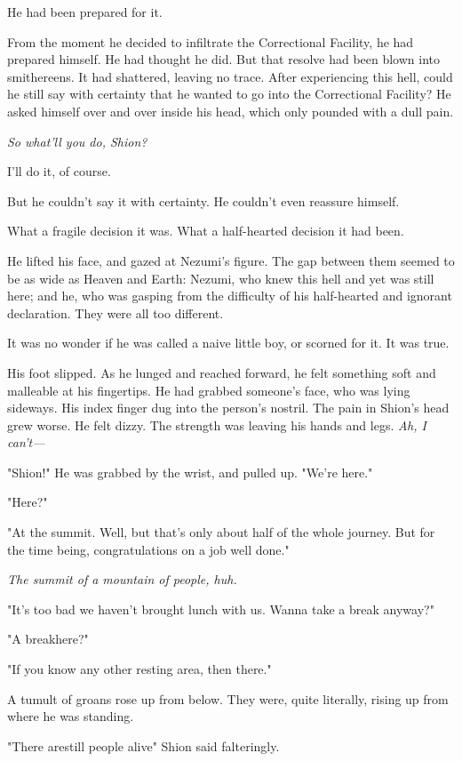 He had been prepared for it.

From the moment he decided to infiltrate the Correctional Facility, he
had prepared himself. He had thought he did. But that resolve had been
blown into smithereens. It had shattered, leaving no trace. After
experiencing this hell, could he still say with certainty that he wanted
to go into the Correctional Facility? He asked himself over and over
inside his head, which only pounded with a dull pain.

\emph{So what'll you do, Shion?}

I'll do it, of course.

But he couldn't say it with certainty. He couldn't even reassure
himself.

What a fragile decision it was. What a half-hearted decision it had
been.

He lifted his face, and gazed at Nezumi's figure. The gap between them
seemed to be as wide as Heaven and Earth: Nezumi, who knew this hell and
yet was still here; and he, who was gasping from the difficulty of his
half-hearted and ignorant declaration. They were all too different.

It was no wonder if he was called a naive little boy, or scorned for it.
It was true.

His foot slipped. As he lunged and reached forward, he felt something
soft and malleable at his fingertips. He had grabbed someone's face, who
was lying sideways. His index finger dug into the person's nostril. The
pain in Shion's head grew worse. He felt dizzy. The strength was leaving
his hands and legs. \emph{Ah, I can't---}

"Shion!" He was grabbed by the wrist, and pulled up. "We're here."

"Here?"

"At the summit. Well, but that's only about half of the whole journey.
But for the time being, congratulations on a job well done."

\emph{The summit of a mountain of people, huh.}

"It's too bad we haven't brought lunch with us. Wanna take a break
anyway?"

"A break\el here?"

"If you know any other resting area, then there."

A tumult of groans rose up from below. They were, quite literally,
rising up from where he was standing.

"There are\el still people alive\el " Shion said falteringly.

